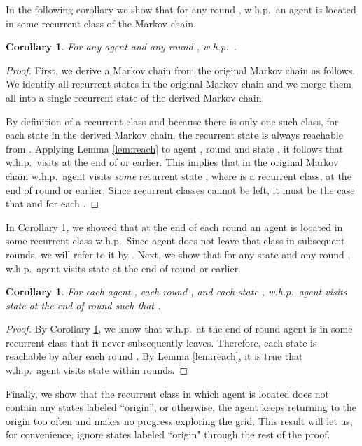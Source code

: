 \documentclass[11pt]{article}
\newtheorem{corollary}[theorem]{Corollary}
\begin{document}
In the following corollary we show that for any round , w.h.p.\ an agent is located in some recurrent class of the Markov chain.

\begin{corollary}
\label{cor:initial}
	For any agent  and any round , w.h.p.\ .
\end{corollary}
\begin{proof}
First, we derive a Markov chain from the original Markov chain as follows. We identify all recurrent states in the original Markov chain and we merge them all into a single recurrent state  of the derived Markov chain.

By definition of a recurrent class and because there is only one such class, for each state  in the derived Markov chain, the recurrent state  is always reachable from . Applying Lemma \ref{lem:reach} to agent , round  and state , it follows that w.h.p.\  visits  at the end of  or earlier. This implies that in the original Markov chain w.h.p.\ agent  visits \emph{some} recurrent state , where  is a recurrent class, at the end of round  or earlier.
Since recurrent classes cannot be left, it must be the case that  and  for each .
\end{proof}

In Corollary \ref{cor:initial}, we showed that at the end of each round  an agent  is located in some recurrent class  w.h.p.\ Since agent  does not leave that class in subsequent rounds, we will refer to it by . Next, we show that for any state  and any round , w.h.p.\ agent  visits state  at the end of round  or earlier.

\begin{corollary}
\label{cor:visits}
For each agent , each round , and each state , w.h.p.\ agent  visits state  at the end of round  such that .
\end{corollary}

\begin{proof}
	By Corollary \ref{cor:initial}, we know that w.h.p.\ at the end of round  agent  is in some recurrent class  that it never subsequently leaves. Therefore, each state  is reachable by  after each round . By Lemma \ref{lem:reach},  it is true that w.h.p.\ agent  visits state  within  rounds.
\end{proof}

Finally, we show that the recurrent class  in which agent  is located does not contain any states labeled ``origin'', or otherwise, the agent keeps returning to the origin too often and makes no progress exploring the grid. This result will let us, for convenience, ignore states labeled ``origin" through the rest of the proof.
\end{document}
